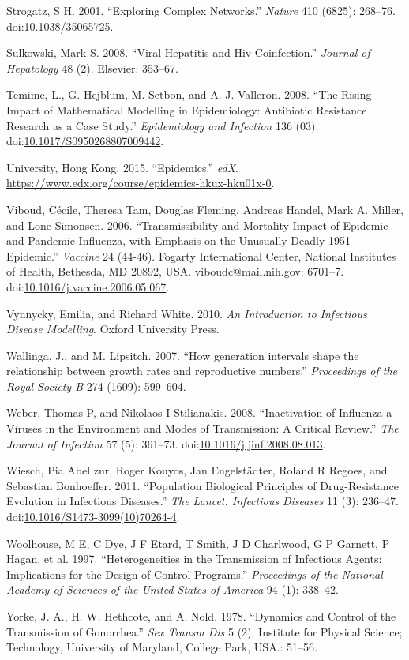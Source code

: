 \documentclass[]{book}
\theoremstyle{definition}
\theoremstyle{definition}
\theoremstyle{definition}
\theoremstyle{remark}
\begin{document}
\hypertarget{ref-strogatz01}{}
Strogatz, S H. 2001. ``Exploring Complex Networks.'' \emph{Nature} 410
(6825): 268--76.
doi:\href{https://doi.org/10.1038/35065725}{10.1038/35065725}.

\hypertarget{ref-sulkowski08}{}
Sulkowski, Mark S. 2008. ``Viral Hepatitis and Hiv Coinfection.''
\emph{Journal of Hepatology} 48 (2). Elsevier: 353--67.

\hypertarget{ref-temime08}{}
Temime, L., G. Hejblum, M. Setbon, and A. J. Valleron. 2008. ``The
Rising Impact of Mathematical Modelling in Epidemiology: Antibiotic
Resistance Research as a Case Study.'' \emph{Epidemiology and Infection}
136 (03).
doi:\href{https://doi.org/10.1017/S0950268807009442}{10.1017/S0950268807009442}.

\hypertarget{ref-hkepidemics}{}
University, Hong Kong. 2015. ``Epidemics.'' \emph{edX}.
\url{https://www.edx.org/course/epidemics-hkux-hku01x-0}.

\hypertarget{ref-viboud06}{}
Viboud, Cécile, Theresa Tam, Douglas Fleming, Andreas Handel, Mark A.
Miller, and Lone Simonsen. 2006. ``Transmissibility and Mortality Impact
of Epidemic and Pandemic Influenza, with Emphasis on the Unusually
Deadly 1951 Epidemic.'' \emph{Vaccine} 24 (44-46). Fogarty International
Center, National Institutes of Health, Bethesda, MD 20892, USA.
viboudc@mail.nih.gov: 6701--7.
doi:\href{https://doi.org/10.1016/j.vaccine.2006.05.067}{10.1016/j.vaccine.2006.05.067}.

\hypertarget{ref-vynnycky10}{}
Vynnycky, Emilia, and Richard White. 2010. \emph{An Introduction to
Infectious Disease Modelling}. Oxford University Press.

\hypertarget{ref-wallinga07}{}
Wallinga, J., and M. Lipsitch. 2007. ``How generation intervals shape
the relationship between growth rates and reproductive numbers.''
\emph{Proceedings of the Royal Society B} 274 (1609): 599--604.

\hypertarget{ref-weber08}{}
Weber, Thomas P, and Nikolaos I Stilianakis. 2008. ``Inactivation of
Influenza a Viruses in the Environment and Modes of Transmission: A
Critical Review.'' \emph{The Journal of Infection} 57 (5): 361--73.
doi:\href{https://doi.org/10.1016/j.jinf.2008.08.013}{10.1016/j.jinf.2008.08.013}.

\hypertarget{ref-wiesch11}{}
Wiesch, Pia Abel zur, Roger Kouyos, Jan Engelstädter, Roland R Regoes,
and Sebastian Bonhoeffer. 2011. ``Population Biological Principles of
Drug-Resistance Evolution in Infectious Diseases.'' \emph{The Lancet.
Infectious Diseases} 11 (3): 236--47.
doi:\href{https://doi.org/10.1016/S1473-3099(10)70264-4}{10.1016/S1473-3099(10)70264-4}.

\hypertarget{ref-woolhouse97}{}
Woolhouse, M E, C Dye, J F Etard, T Smith, J D Charlwood, G P Garnett, P
Hagan, et al. 1997. ``Heterogeneities in the Transmission of Infectious
Agents: Implications for the Design of Control Programs.''
\emph{Proceedings of the National Academy of Sciences of the United
States of America} 94 (1): 338--42.

\hypertarget{ref-yorke78}{}
Yorke, J. A., H. W. Hethcote, and A. Nold. 1978. ``Dynamics and Control
of the Transmission of Gonorrhea.'' \emph{Sex Transm Dis} 5 (2).
Institute for Physical Science; Technology, University of Maryland,
College Park, USA.: 51--56.
\end{document}
